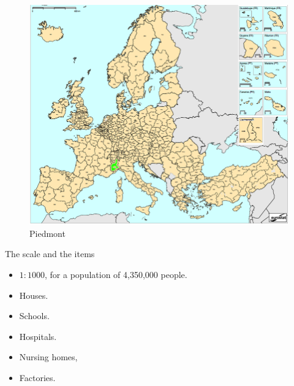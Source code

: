 \documentclass[9pt]{beamer}
\begin{document}
\begin{frame}{~}

\begin{figure}[H]
\center
\includegraphics[scale=0.25]{Piedmont.png}

\caption{Piedmont} 
\label{Piedmont}
\end{figure}

\end{frame}
\begin{frame}{The scale and the items}

\begin{itemize}

\item $1:1000$, for a population of 4,350,000 people.

\bigskip

\item Houses.
\item Schools.
\item Hospitals.
\item Nursing homes,
\item Factories.

\end{itemize}

\end{frame}


\end{document}
